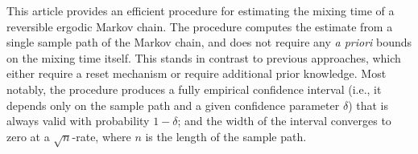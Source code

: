 This article provides an efficient procedure for estimating the mixing
time of a reversible ergodic Markov chain.
The procedure computes the estimate from a single sample path of the
Markov chain, and does not require any \emph{a priori} bounds on the
mixing time itself.
This stands in contrast to previous approaches, which either require a
reset mechanism or require additional prior knowledge.
Most notably, the procedure produces a fully empirical confidence
interval (i.e., it depends only on the sample path and a given
confidence parameter $\delta$) that is always valid with probability
$1-\delta$; and the width of the interval converges to zero at a
$\sqrt{n}$-rate, where $n$ is the length of the sample path.

%
%

